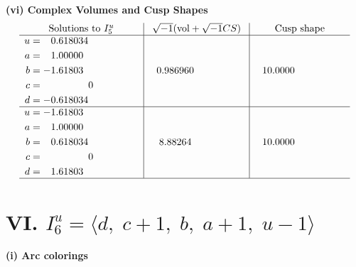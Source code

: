 \documentclass[1p]{elsarticle_modified}
\theoremstyle{definition}
\newcommand{\I}{\sqrt{-1}}
\begin{document}
\newpage\flushleft \textbf{(vi) Complex Volumes and Cusp Shapes}
$$\begin{array}{c|c|c}  
\text{Solutions to }I^u_{5}& \I (\text{vol} + \sqrt{-1}CS) & \text{Cusp shape}\\
 \hline 
\begin{aligned}
u &= \phantom{-}0.618034\phantom{ +0.000000I} \\
a &= \phantom{-}1.00000\phantom{ +0.000000I} \\
b &= -1.61803\phantom{ +0.000000I} \\
c &= \phantom{-0.000000 } 0 \\
d &= -0.618034\phantom{ +0.000000I}\end{aligned}
 & \phantom{-}0.986960\phantom{ +0.000000I} & \phantom{-}10.0000\phantom{ +0.000000I} \\ \hline\begin{aligned}
u &= -1.61803\phantom{ +0.000000I} \\
a &= \phantom{-}1.00000\phantom{ +0.000000I} \\
b &= \phantom{-}0.618034\phantom{ +0.000000I} \\
c &= \phantom{-0.000000 } 0 \\
d &= \phantom{-}1.61803\phantom{ +0.000000I}\end{aligned}
 & \phantom{-}8.88264\phantom{ +0.000000I} & \phantom{-}10.0000\phantom{ +0.000000I}\\
 \hline 
 \end{array}$$\newpage\newpage\renewcommand{\arraystretch}{1}
\centering \section*{VI. $I^u_{6}= \langle d,\;c+1,\;b,\;a+1,\;u-1 \rangle$}
\flushleft \textbf{(i) Arc colorings}\\
\end{document}
